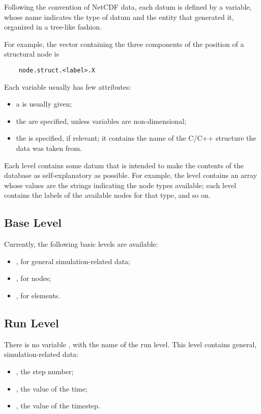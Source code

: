 Following the convention of NetCDF data, each datum is defined
by a variable, whose name indicates the type of datum and the entity
that generated it, organized in a tree-like fashion.

For example, the vector containing the three components 
of the position of a structural node is
\begin{verbatim}
    node.struct.<label>.X
\end{verbatim}
Each variable usually has few attributes:
\begin{itemize}
\item a  is usually given;
\item the  are specified, unless variables are non-dimensional;
\item the  is specified, if relevant;
it contains the name of the C/C++ structure the data was taken from.
\end{itemize}

Each level contains some datum that is intended to make the contents
of the database as self-explanatory as possible.
For example, the level  contains an array whose values
are the strings indicating the node types available;
each level  contains the labels of the available nodes
for that type, and so on.



\subsection{Base Level}
Currently, the following basic levels are available:
\begin{itemize}
\item {}, for general simulation-related data;
\item {}, for nodes;
\item {}, for elements.
\end{itemize}



\subsection{Run Level}
There is no variable , with the name of the run level.
This level contains general, simulation-related data:
\begin{itemize}
\item {}, the step number;
\item {}, the value of the time;
\item {}, the value of the timestep.
\end{itemize}



